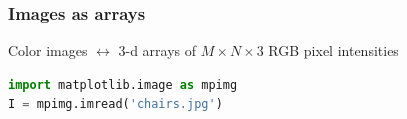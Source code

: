 \begin{frame}[fragile]
  \frametitle{Images as arrays}

  \begin{center}
    Color images $\leftrightarrow$ 3-d arrays of $M \times N \times 3$ RGB pixel intensities
    \vskip20pt
  \end{center}

    \begin{block}{}
        \begin{lstlisting}[language=python]
import matplotlib.image as mpimg
I = mpimg.imread('chairs.jpg')
        \end{lstlisting}
    \end{block}

\end{frame}

